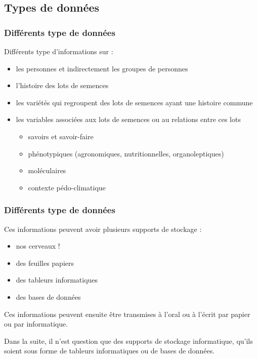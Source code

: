 \subsection{Types de données} 

\begin{frame} 
\frametitle{Différents type de données}

Différents type d'informations sur :

\begin{itemize}
\item les personnes et indirectement les groupes de personnes
\item l'histoire des lots de semences
\item les variétés qui regroupent des lots de semences ayant une histoire commune
\item les variables associées aux lots de semences ou au relations entre ces lots
	\begin{itemize}
	\item savoirs et savoir-faire
	\item phénotypiques (agronomiques, nutritionnelles, organoleptiques)
	\item moléculaires
	\item contexte pédo-climatique
	\end{itemize}
\end{itemize}

\end{frame}


\begin{frame} 
\frametitle{Différents type de données}

Ces informations peuvent avoir plusieurs supports de stockage :
\begin{itemize}
\item nos cerveaux !
\item des feuilles papiers
\item des tableurs informatiques
\item des bases de données
\end{itemize}

\vfill

Ces informations peuvent ensuite être transmises à l'oral ou à l'écrit par papier ou par informatique.

\begin{block}{}
Dans la suite, il n'est question que des supports de stockage informatique,
qu'ils soient sous forme de tableurs informatiques ou de bases de données.
\end{block}

\end{frame}



